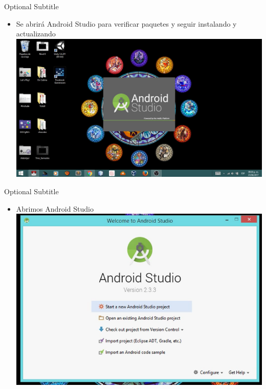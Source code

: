 \documentclass{beamer}
\begin{document}
\begin{frame}{13}{Optional Subtitle}
  \begin{itemize}
  \item {
    Se abrirá Android Studio para verificar paquetes y seguir instalando y actualizando
  }
  \includegraphics[width=\linewidth]{image/IU13}
  \end{itemize}
\end{frame}

\begin{frame}{14}{Optional Subtitle}
  \begin{itemize}
  \item {
   Abrimos Android Studio
  }
  \includegraphics[width=\linewidth]{image/IU14}
  \end{itemize}
\end{frame}
\end{document}
